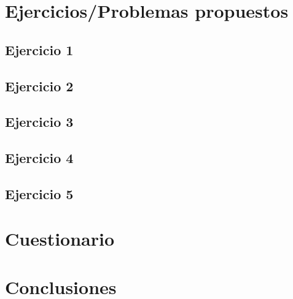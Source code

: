 \documentclass{article}
\begin{document}
\section{Ejercicios/Problemas propuestos}

\subsection{Ejercicio 1}
% 

\subsection{Ejercicio 2}
% 

\subsection{Ejercicio 3}
% 

\subsection{Ejercicio 4}
% 

\subsection{Ejercicio 5}
% 

\section{Cuestionario}

\section{Conclusiones}
\end{document}
